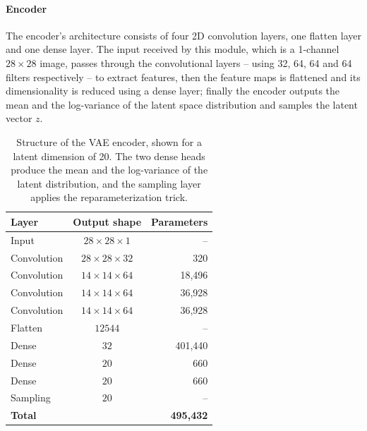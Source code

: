 \paragraph{Encoder}
\hfill \break
The encoder's architecture consists of four 2D convolution layers, one flatten layer and one dense layer. The input received by this module, which is a 1-channel $28\times28$ image, passes through the convolutional layers -- using 32, 64, 64 and 64 filters respectively -- to extract features, then the feature maps is flattened and its dimensionality is reduced using a dense layer; finally the encoder outputs the mean and the log-variance of the latent space distribution and samples the latent vector $z$.
\begin{table}[H]
    \centering
    \begin{tabular}{l c r}
    \textbf{Layer} & \textbf{Output shape} & \textbf{Parameters} \\
    \hline
    Input & \( 28 \times 28 \times 1 \) & -- \\
    Convolution & \( 28 \times 28 \times 32 \) & 320 \\
    Convolution & \( 14 \times 14 \times 64 \) & 18{,}496 \\
    Convolution & \( 14 \times 14 \times 64 \) & 36{,}928 \\
    Convolution & \( 14 \times 14 \times 64 \) & 36{,}928 \\
    Flatten & \( 12544 \) & -- \\
    Dense & \( 32 \) & 401{,}440 \\
    Dense & \( 20 \) & 660 \\
    Dense & \( 20 \) & 660 \\
    Sampling & \( 20 \) & -- \\
    \hline
    \textbf{Total} & & \textbf{495{,}432} \\
    \end{tabular}
    \caption{Structure of the VAE encoder, shown for a latent dimension of 20. The two dense heads produce the mean and the log-variance of the latent distribution, and the sampling layer applies the reparameterization trick.}
    \label{tab:vae encoder}
\end{table}
